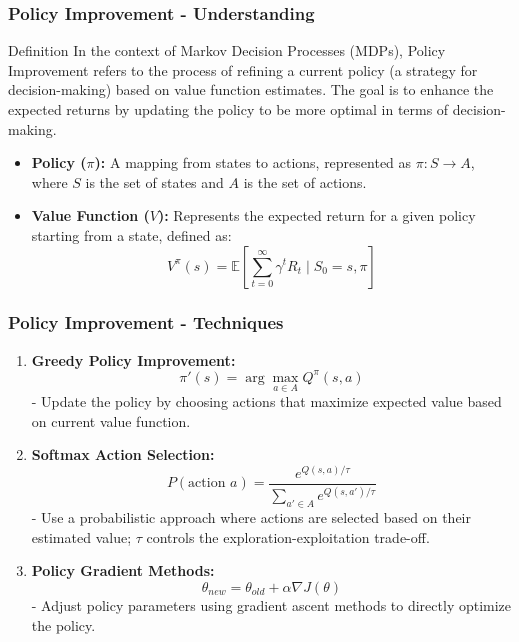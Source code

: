 \documentclass[aspectratio=169]{beamer}
\begin{document}
\begin{frame}[fragile]
    \frametitle{Policy Improvement - Understanding}
    \begin{block}{Definition}
        In the context of Markov Decision Processes (MDPs), Policy Improvement refers to the process of refining a current policy (a strategy for decision-making) based on value function estimates. The goal is to enhance the expected returns by updating the policy to be more optimal in terms of decision-making.
    \end{block}
    \begin{itemize}
        \item \textbf{Policy ($\pi$):} A mapping from states to actions, represented as $\pi: S \rightarrow A$, where $S$ is the set of states and $A$ is the set of actions.
        \item \textbf{Value Function ($V$):} Represents the expected return for a given policy starting from a state, defined as:
        \[
        V^\pi(s) = \mathbb{E}\left[\sum_{t=0}^{\infty} \gamma^t R_t \mid S_0 = s, \pi\right]
        \]
    \end{itemize}
\end{frame}

\begin{frame}[fragile]
    \frametitle{Policy Improvement - Techniques}
    \begin{enumerate}
        \item \textbf{Greedy Policy Improvement:}
        \begin{equation}
            \pi'(s) = \arg\max_{a \in A} Q^\pi(s, a)
        \end{equation}
        - Update the policy by choosing actions that maximize expected value based on current value function.

        \item \textbf{Softmax Action Selection:}
        \begin{equation}
            P(\text{action } a) = \frac{e^{Q(s, a)/\tau}}{\sum_{a' \in A} e^{Q(s, a')/\tau}}
        \end{equation}
        - Use a probabilistic approach where actions are selected based on their estimated value; $\tau$ controls the exploration-exploitation trade-off.

        \item \textbf{Policy Gradient Methods:}
        \begin{equation}
            \theta_{new} = \theta_{old} + \alpha \nabla J(\theta)
        \end{equation}
        - Adjust policy parameters using gradient ascent methods to directly optimize the policy.
    \end{enumerate}
\end{frame}
\end{document}
